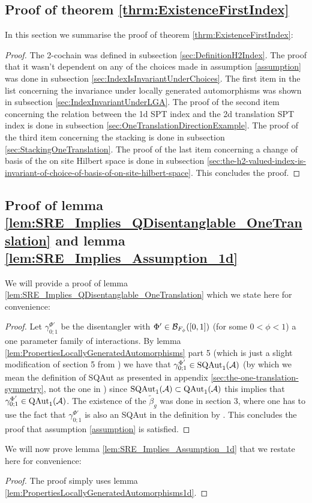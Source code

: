 \documentclass[12pt,a4paper,twoside]{article}
\numberwithin{equation}{section}
\begin{document}
\subsection{Proof of theorem \ref{thrm:ExistenceFirstIndex}}\label{sec:ProofOf:thrm:ExistenceFirstIndex}
In this section we summarise the proof of theorem \ref{thrm:ExistenceFirstIndex}:
\begin{proof}
	The 2-cochain was defined in subsection \ref{sec:DefinitionH2Index}. The proof that it wasn't dependent on any of the choices made in assumption \ref{assumption} was done in subsection \ref{sec:IndexIsInvariantUnderChoices}. The first item in the list concerning the invariance under locally generated automorphisms was shown in subsection \ref{sec:IndexInvariantUnderLGA}. The proof of the second item concerning the relation between the 1d SPT index and the 2d translation SPT index is done in subsection \ref{sec:OneTranslationDirectionExample}. The proof of the third item concerning the stacking is done in subsection \ref{sec:StackingOneTranslation}. The proof of the last item concerning a change of basis of the on site Hilbert space is done in subsection \ref{sec:the-h2-valued-index-is-invariant-of-choice-of-basis-of-on-site-hilbert-space}. This concludes the proof.
\end{proof}
\subsection{Proof of lemma \ref{lem:SRE_Implies_QDisentanglable_OneTranslation} and lemma \ref{lem:SRE_Implies_Assumption_1d}}\label{sec:ProofOfMainResult1}
We will provide a proof of lemma \ref{lem:SRE_Implies_QDisentanglable_OneTranslation} which we state here for convenience:
\SREImpliesQDisentanglableOneTranslation*
\begin{proof}
	Let $\gamma^{\Phi'}_{0;1}$ be the disentangler with $\Phi'\in\BB_{F_\phi}([0,1])$ (for some $0<\phi<1$) a one parameter family of interactions. By lemma \ref{lem:PropertiesLocallyGeneratedAutomorphisms} part 5 (which is just a slight modification of section 5 from \cite{ogata2021h3gmathbb}) we have that $\gamma^{\Phi'}_{0;1}\in\textrm{SQAut}_1(\AA)$ (by which we mean the definition of SQAut as presented in appendix \ref{sec:the-one-translation-symmetry}, not the one in \cite{ogata2021h3gmathbb}) since $\textrm{SQAut}_1(\AA)\subset\QAut{\AA}$ this implies that $\gamma^{\Phi'}_{0;1}\in\QAut{\AA}$. The existence of the $\tilde{\beta}_g$ was done in \cite{ogata2021h3gmathbb} section 3, where one has to use the fact that $\gamma^{\Phi'}_{0;1}$ is also an SQAut in the definition by \cite{ogata2021h3gmathbb}. This concludes the proof that assumption \ref{assumption} is satisfied.
\end{proof}
We will now prove lemma \ref{lem:SRE_Implies_Assumption_1d} that we restate here for convenience:
\SREImpliesAssumptionOneDimensional*
\begin{proof}
	The proof simply uses lemma \ref{lem:PropertiesLocallyGeneratedAutomorphisms1d}.
\end{proof}

\end{document}
